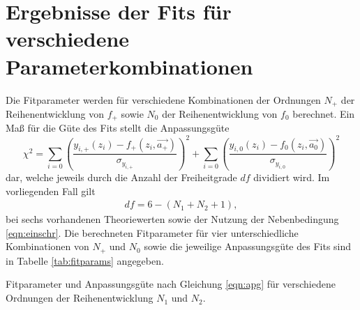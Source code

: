 \section{Ergebnisse der Fits für verschiedene Parameterkombinationen}
\label{sec:fits}

Die Fitparameter werden für verschiedene Kombinationen der Ordnungen $N_+$ der Reihenentwicklung von $f_+$ sowie $N_0$ der Reihenentwicklung von $f_0$ berechnet.
Ein Maß für die Güte des Fits stellt die Anpassungsgüte 
\begin{equation}
  \label{eqn:apg}
  \chi^2 = \sum_{i=0}^{} \left( \frac{y_{i,+}(z_i) - f_{+}(z_i, \vec{a_+})}{\sigma_{y_{i,+}}} \right)^2 + \sum_{i=0}^{} \left( \frac{y_{i,0}(z_i) - f_{0}(z_i, \vec{a_0})}{\sigma_{y_{i,0}}}  \right)^2
\end{equation}
dar, welche jeweils durch die Anzahl der Freiheitgrade $df$ dividiert wird.
Im vorliegenden Fall gilt
\begin{align*}
  df = 6 - (N_1 + N_2 + 1),
\end{align*}
bei sechs vorhandenen Theoriewerten sowie der Nutzung der Nebenbedingung \eqref{eqn:einschr}.
Die berechneten Fitparameter für vier unterschiedliche Kombinationen von $N_+$ und $N_0$ sowie die jeweilige Anpassungsgüte des Fits sind in Tabelle \ref{tab:fitparams} angegeben.
\begin{table}
  \centering
  \caption{Fitparameter und Anpassungsgüte nach Gleichung \eqref{eqn:apg} für verschiedene Ordnungen der Reihenentwicklung $N_1$ und $N_2$.}
  \begin{subtable}{0.48\textwidth}
    \centering
    
  \end{subtable}
  \begin{subtable}{0.48\textwidth}
    \centering
    
  \end{subtable}
  \begin{subtable}[t]{0.48\textwidth}
    \vspace{15px}
    \centering
    
  \end{subtable}
  \begin{subtable}[t]{0.48\textwidth}
    \vspace{15px}
    \centering
    
  \end{subtable}
  \vspace{10px}
  \label{tab:fitparams}
\end{table}
